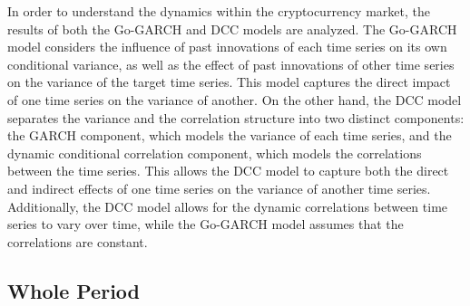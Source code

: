 \documentclass[11pt,preprint, authoryear]{elsarticle}
\numberwithin{equation}{section}
\numberwithin{figure}{section}
\numberwithin{table}{section}
\begin{document}
In order to understand the dynamics within the cryptocurrency market,
the results of both the Go-GARCH and DCC models are analyzed. The
Go-GARCH model considers the influence of past innovations of each time
series on its own conditional variance, as well as the effect of past
innovations of other time series on the variance of the target time
series. This model captures the direct impact of one time series on the
variance of another. On the other hand, the DCC model separates the
variance and the correlation structure into two distinct components: the
GARCH component, which models the variance of each time series, and the
dynamic conditional correlation component, which models the correlations
between the time series. This allows the DCC model to capture both the
direct and indirect effects of one time series on the variance of
another time series. Additionally, the DCC model allows for the dynamic
correlations between time series to vary over time, while the Go-GARCH
model assumes that the correlations are constant.

\hypertarget{whole-period}{%
\subsection{Whole Period}\label{whole-period}}
\end{document}
